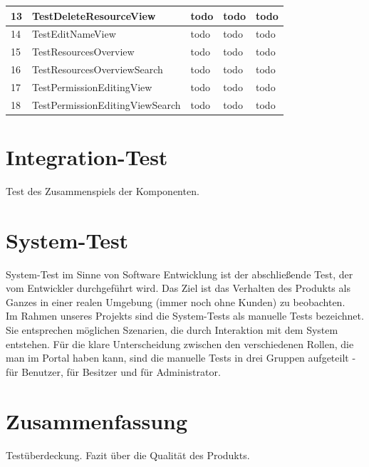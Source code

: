 \documentclass[parskip=full,11pt]{scrartcl}
\begin{document}
\begin{longtable}[c]{|l|l|l|l|l|}
13 & TestDeleteResourceView 
& todo %
& todo %
& todo	%
\\ \hline

14 & TestEditNameView
& todo %
& todo %
& todo	%
\\ \hline

15 & TestResourcesOverview
& todo %
& todo %
& todo	%
\\ \hline

16 & TestResourcesOverviewSearch
& todo %
& todo %
& todo	%
\\ \hline

17 & TestPermissionEditingView
& todo %
& todo %
& todo	%
\\ \hline

18 & TestPermissionEditingViewSearch 
& todo %
& todo %
& todo	%
\\ \hline
\end{longtable}
\newpage


\section{Integration-Test}
Test des Zusammenspiels der Komponenten.

\newpage
\section{System-Test}
System-Test im Sinne von Software Entwicklung ist der abschließende Test, der vom Entwickler durchgeführt wird. Das Ziel ist das Verhalten des Produkts als Ganzes in einer realen Umgebung (immer noch ohne Kunden) zu beobachten.\\
Im Rahmen unseres Projekts sind die System-Tests als manuelle Tests bezeichnet. Sie entsprechen möglichen Szenarien, die durch Interaktion mit dem System entstehen. Für die klare Unterscheidung zwischen den verschiedenen Rollen, die man im Portal haben kann, sind die manuelle Tests in drei Gruppen aufgeteilt - für Benutzer, für Besitzer und für Administrator.

\newpage
\section{Zusammenfassung}
Testüberdeckung. Fazit über die Qualität des Produkts.
\end{document}
